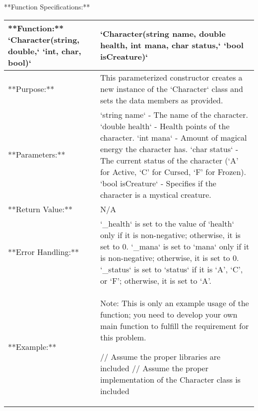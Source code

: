 {{{{{{{{{{{\begin{longtable}{|p{2.0in}|p{4.0in}|}
\end{longtable}

**Function Specifications:**

\renewcommand{\arraystretch}{1.5}
\begin{longtable}{|p{1.7in}|p{4.3in}|}
\hline
**Function:** `Character(string, double,` \newline `int, char, bool)` & `Character(string name, double health, int mana, char status,` \newline `bool isCreature)` \\ \hline

**Purpose:** & This parameterized constructor creates a new instance of the `Character` class and sets the data members as provided. \\ \hline

**Parameters:** & 
`string name` - The name of the character. \newline
`double health` - Health points of the character. \newline
`int mana` - Amount of magical energy the character has. \newline
`char status` - The current status of the character (`A' for Active, `C' for Cursed, `F' for Frozen). \newline
`bool isCreature` - Specifies if the character is a mystical creature. \\ \hline

**Return Value:** & N/A \\ \hline

**Error Handling:** & 
`_health` is set to the value of `health` only if it is non-negative; otherwise, it is set to 0. \newline
`_mana` is set to `mana` only if it is non-negative; otherwise, it is set to 0. \newline
`_status` is set to `status` if it is `A', `C', or `F'; otherwise, it is set to `A'. \\ \hline

**Example:** & 

\begin{example}

Note: This is only an example usage of the function; you need to develop your own main function to fulfill the requirement for this problem.

{%

// Assume the proper libraries are included
// Assume the proper implementation of the Character class is included

}
\end{example}
\end{longtable}}}}}}}}}}}}
